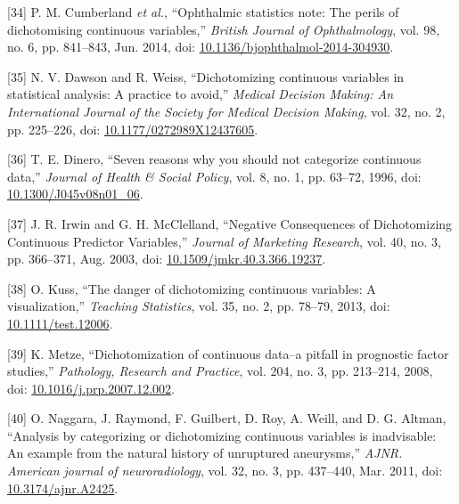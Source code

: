 \documentclass[
]{article}
\newenvironment{cslreferences}%
  {}%
  {\par}
\begin{document}
\begin{cslreferences}
\leavevmode\hypertarget{ref-cumberland_ophthalmic_2014-1}{}%
{[}34{]} P. M. Cumberland \emph{et al.}, ``Ophthalmic statistics note: The perils of dichotomising continuous variables,'' \emph{British Journal of Ophthalmology}, vol. 98, no. 6, pp. 841--843, Jun. 2014, doi: \href{https://doi.org/10.1136/bjophthalmol-2014-304930}{10.1136/bjophthalmol-2014-304930}.

\leavevmode\hypertarget{ref-dawson_dichotomizing_2012-1}{}%
{[}35{]} N. V. Dawson and R. Weiss, ``Dichotomizing continuous variables in statistical analysis: A practice to avoid,'' \emph{Medical Decision Making: An International Journal of the Society for Medical Decision Making}, vol. 32, no. 2, pp. 225--226, doi: \href{https://doi.org/10.1177/0272989X12437605}{10.1177/0272989X12437605}.

\leavevmode\hypertarget{ref-dinero_seven_1996-1}{}%
{[}36{]} T. E. Dinero, ``Seven reasons why you should not categorize continuous data,'' \emph{Journal of Health \& Social Policy}, vol. 8, no. 1, pp. 63--72, 1996, doi: \href{https://doi.org/10.1300/J045v08n01_06}{10.1300/J045v08n01\_06}.

\leavevmode\hypertarget{ref-irwin_negative_2003}{}%
{[}37{]} J. R. Irwin and G. H. McClelland, ``Negative Consequences of Dichotomizing Continuous Predictor Variables,'' \emph{Journal of Marketing Research}, vol. 40, no. 3, pp. 366--371, Aug. 2003, doi: \href{https://doi.org/10.1509/jmkr.40.3.366.19237}{10.1509/jmkr.40.3.366.19237}.

\leavevmode\hypertarget{ref-kuss_danger_2013}{}%
{[}38{]} O. Kuss, ``The danger of dichotomizing continuous variables: A visualization,'' \emph{Teaching Statistics}, vol. 35, no. 2, pp. 78--79, 2013, doi: \href{https://doi.org/10.1111/test.12006}{10.1111/test.12006}.

\leavevmode\hypertarget{ref-metze_dichotomization_2008}{}%
{[}39{]} K. Metze, ``Dichotomization of continuous data--a pitfall in prognostic factor studies,'' \emph{Pathology, Research and Practice}, vol. 204, no. 3, pp. 213--214, 2008, doi: \href{https://doi.org/10.1016/j.prp.2007.12.002}{10.1016/j.prp.2007.12.002}.

\leavevmode\hypertarget{ref-naggara_analysis_2011}{}%
{[}40{]} O. Naggara, J. Raymond, F. Guilbert, D. Roy, A. Weill, and D. G. Altman, ``Analysis by categorizing or dichotomizing continuous variables is inadvisable: An example from the natural history of unruptured aneurysms,'' \emph{AJNR. American journal of neuroradiology}, vol. 32, no. 3, pp. 437--440, Mar. 2011, doi: \href{https://doi.org/10.3174/ajnr.A2425}{10.3174/ajnr.A2425}.


\end{cslreferences}
\end{document}

